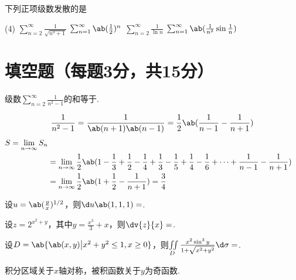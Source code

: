 \begin{exercise}
    下列正项级数发散的是
    \begin{tasks}(4)
        \task $\sum_{n=2}^{\infty}{\frac{1}{\sqrt{n^3+1}}}$
        \task $\sum_{n=1}^{\infty}\ab(\frac{1}{2})^n$
        \task $\sum_{n=2}^{\infty}{\frac{1}{\ln{n}}}$
        \task $\sum_{n=1}^{\infty}{\ab(\frac{1}{n^2}\sin{\frac{1}{n}})}$
    \end{tasks}
\end{exercise}

\section{填空题（每题3分，共15分）}
\begin{exercise}
    级数$\sum_{n=2}^{\infty}{\frac{1}{n^2-1}}$的和等于.
\end{exercise}
\begin{solution}
    $$\frac{1}{n^2-1}=\frac{1}{\ab(n+1)\ab(n-1)}=\frac{1}{2}\ab(\frac{1}{n-1}-\frac{1}{n+1})$$
    $$
    \begin{aligned}
        S=\lim_{n\to\infty}{S_n}\\
        &=\lim_{n\to\infty}{\frac{1}{2}\ab(1-\frac{1}{3}+\frac{1}{2}-\frac{1}{4}+\frac{1}{3}-\frac{1}{5}+\frac{1}{4}-\frac{1}{6}+\cdots+\frac{1}{n-1}-\frac{1}{n+1})}\\
        &=\lim_{n\to\infty}{\frac{1}{2}\ab(1+\frac{1}{2}-\frac{1}{n+1})}=\frac{3}{4}
    \end{aligned}
    $$
\end{solution}

\begin{exercise}
    设$u=\ab(\frac{y}{x})^{1/2}$，则$\d u\ab(1,1,1)=$.
\end{exercise}

\begin{exercise}
    设$z=2^{x^2+y}$，其中$y=\frac{x^3}{3}+x$，则$\dv{z}{x}=$.
\end{exercise}

\begin{exercise}
    设$D=\ab{\ab(x,y)\big|x^2+y^2\le 1,x\ge 0}$，则$\iint\limits_D{\frac{x^2\sin^3{y}}{1+\sqrt{x^2+y^2}}\d\sigma}=$.
\end{exercise}
\begin{solution}
    积分区域关于$x$轴对称，被积函数关于$y$为奇函数.
\end{solution}

